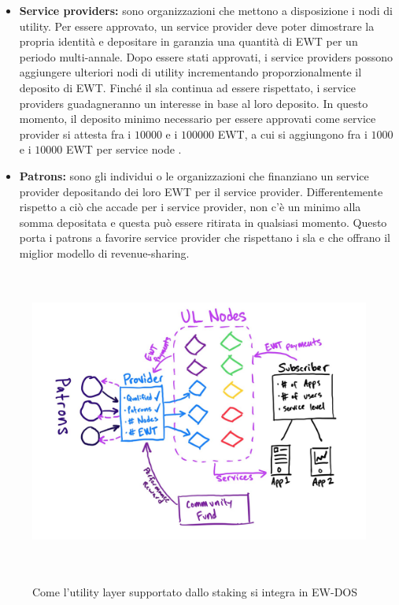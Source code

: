\documentclass[12pt, letterpaper, twoside]{article}
\begin{document}
\begin{itemize}
    \item \textbf{Service providers:} sono organizzazioni che mettono a disposizione i nodi di utility. 
    Per essere approvato, un service provider deve poter dimostrare la propria identità e depositare in garanzia una quantità di EWT per un periodo multi-annale.
    Dopo essere stati approvati, i service providers possono aggiungere ulteriori nodi di utility incrementando proporzionalmente il deposito di EWT.
    Finché il \gls{sla} continua ad essere rispettato, i service providers guadagneranno un interesse in base al loro deposito.
    In questo momento, il deposito minimo necessario per essere approvati come service provider si attesta fra i $10000$ e i $100000$ EWT, a cui si aggiungono fra i $1000$ e i $10000$ EWT per service node \cite{art:ew-staking}.
    \item \textbf{Patrons:} sono gli individui o le organizzazioni che finanziano un service provider depositando dei loro EWT per il service provider.
    Differentemente rispetto a ciò che accade per i service provider, non c'è un minimo alla somma depositata e questa può essere ritirata in qualsiasi momento.
    Questo porta i patrons a favorire service provider che rispettano i \gls{sla} e che offrano il miglior modello di revenue-sharing.
\end{itemize}

\begin{figure}[!h]
    \includegraphics[height=10cm,keepaspectratio]{ew-staking}
    \centering
    \label{ew-staking}
    \caption{Come l'utility layer supportato dallo staking si integra in EW-DOS \cite{art:ew-staking}}
\end{figure}

\newpage

\printbibliography
\end{document}
